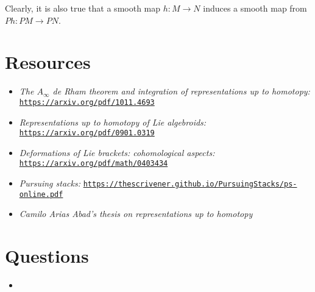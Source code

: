 \documentclass[aps,pra,showpacs,notitlepage,onecolumn,superscriptaddress,nofootinbib]{revtex4-1}
\theoremstyle{definition}
\begin{document}
Clearly, it is also true that a smooth map $h : M \rightarrow N$ induces a smooth map from $Ph : PM \rightarrow PN$.

\section{Resources}

\begin{itemize}
    \item \emph{The $A_{\infty}$ de Rham theorem and integration of representations up to homotopy:} \href{https://arxiv.org/pdf/1011.4693}{\texttt{https://arxiv.org/pdf/1011.4693}}
    \item \emph{Representations up to homotopy of Lie algebroids:} \href{https://arxiv.org/pdf/0901.0319}{\texttt{https://arxiv.org/pdf/0901.0319}}
    \item \emph{Deformations of Lie brackets: cohomological aspects:} \href{https://arxiv.org/pdf/math/0403434}{\texttt{https://arxiv.org/pdf/math/0403434}}
    \item \emph{Pursuing stacks:} \href{https://thescrivener.github.io/PursuingStacks/ps-online.pdf}{\texttt{https://thescrivener.github.io/PursuingStacks/ps-online.pdf}}
    \item \emph{Camilo Arias Abad's thesis on representations up to homotopy}
\end{itemize}

\section{Questions}

\begin{itemize}
    \item
\end{itemize}
\end{document}
